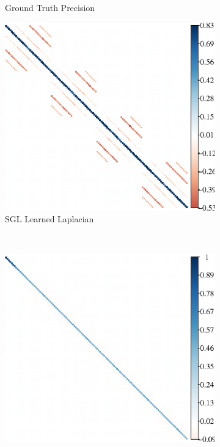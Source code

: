 \begin{figure}[!htb]
\begin{subfigure}[b]{0.3\textwidth}
        \caption{Ground Truth Precision}
    \end{subfigure}
    \hfill %
    \begin{subfigure}[b]{0.3\textwidth}
        \includegraphics[width=\textwidth]{gaussian-process/latex/figures/periodic_gaussian_block_laplacian.eps}
        \caption{SGL Learned Laplacian}
    \end{subfigure} \\
    \begin{subfigure}[b]{0.3\textwidth}
        \includegraphics[width=\textwidth]{gaussian-process/latex/figures/periodic_gaussian_block_glasso_precision.eps}

\end{subfigure}
\end{figure}
